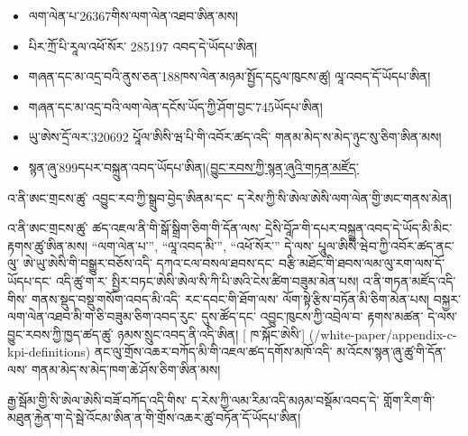 \documentclass[11pt]{article}
\begin{document}
\begin{itemize}[leftmargin=*]
\item ལག་ལེན་པ་26367གིས་ལག་ལེན་འཐབ་ཨིན་མས།
\item པིར་ཀྲོ་པི་རཱལ་འཕོ་སོར་ 285197 འབད་དེ་ཡོདཔ་ཨིན།
\item གཞན་དང་མ་འདྲ་བའི་ནུས་ཅན་188ཁས་ལེན་མཉམ་སྤྱོད་དངུལ་ཁུངས་ཚུ། ལཱ་འབད་དོ་ཡོདཔ་ཨིན།
\item གཞན་དང་མ་འདྲ་བའི་ལག་ལེན་དངོས་ཡོད་ཀྱི་ཤོག་བྱང་745ཡོདཔ་ཨིན།
\item ཡུ་ཨེས་དྲོ་ལར་320692 པཱོལ་ཨིསི་ཝ་པི་གི་འབོར་ཚད་འདི་ གནམ་མེད་ས་མེད་ཉུང་སུ་ཅིག་ཨིན་མས།
\item སྙན་ཞུ་899དཔར་བསྐྲུན་འབད་ཡོདཔ་ཨིན།(\href{https://sarafu.network/reports}{བྱུང་རབས་ཀྱི་སྙན་ཞུའི་གཏན་མཛོད་}
\end{itemize}
འ་ནི་ཨང་གྲངས་ཚུ་ འབྱུང་རབ་ཀྱི་སྒྲུབ་བྱེད་ཨིནམ་དང་ ད་རེས་ཀྱི་སི་ཨེལ་ཨེསི་ལག་ལེན་གྱི་ཨང་གནས་མེན།

འ་ནི་ཨང་གྲངས་ཚུ་ ཚད་འཇལ་ནི་གི་སྒོ་སྒྲིག་ཅིག་གི་དོན་ལས་ དྲེསི་བཱོཌ་གི་དཔར་བསྐྲུན་འབད་དེ་ཡོད་མི་མིང་རྟགས་ཚུ་ཨིན་མས། ``ལག་ལེན་པ་'', ``ལཱ་འབད་མི་'', ``འཕོ་སོར་'' དེ་ལས་ པཱུལ་ཨིསི་ཝེབ་ཀྱི་འབོར་ཚད་ནང་ལུ་ ཨེ་ཡུ་ཨེསི་གི་བསྒྱུར་བཅོས་འདི་ དཀའ་ངལ་བསལ་ཐབས་དང་ བརྩི་མཐོང་གི་ཐབས་ལམ་ལུ་རག་ལས་དོ་ཡོདཔ་དང་ འདི་ཚུ་ག་ར་ སྤྱིར་བཏང་ཨེསི་ཨེལ་སི་ཀི་པི་ཨའི་ངེས་ཚིག་བཟུམ་མེན་པས། འ་ནི་གཏན་མཛོད་འདི་གིས་ གནས་སྡུད་བསྡུ་གསོག་འབད་མི་འདི་ རང་དབང་གི་ཐོག་ལས་ ལོག་སྟེ་རྩིས་བཏོན་མི་ཅིག་མེན་པས། བསྐྱར་ལག་ལེན་འཐབ་མི་ག་ཅི་བཟུམ་ཅིག་འབད་རུང་ དུས་ཚོད་དང་ འབྱུང་ཁུངས་ཀྱི་འབྲེལ་བ་ རྟགས་མཚན་ དེ་ལས་ བྱུང་རབས་ཀྱི་ཁྱད་ཚད་ཚུ་ ཉམས་སྲུང་འབད་ནི་འདི་ཨིན། [ ཁ་སྐོང་ཨེསི་] (/white-paper/appendix-c-kpi-definitions) ནང་ལུ་གྲོས་འཆར་བཀོད་མི་གི་འཇལ་ཚད་དགོས་མཁོ་འདི་ མ་འོངས་སྙན་ཞུ་ཚུ་གི་དོན་ལས་ གནམ་མེད་ས་མེད་ཁག་ཆེ་ཤོས་ཅིག་ཨིན་མས།

རྒྱ་སྦོམ་གྱི་སི་ཨེལ་ཨེསི་བཟོ་བཀོད་འདི་གིས་ ད་རེས་ཀྱི་ལམ་རིམ་འདི་མཉམ་བསྡོམ་འབད་དེ་ གློག་རིག་གི་མཐུན་རྐྱེན་ག་དེ་སྦེ་འོངམ་ཨིན་ན་གི་གྲོས་འཆར་ཚུ་བཏོན་དོ་ཡོདཔ་ཨིན།
\end{document}
